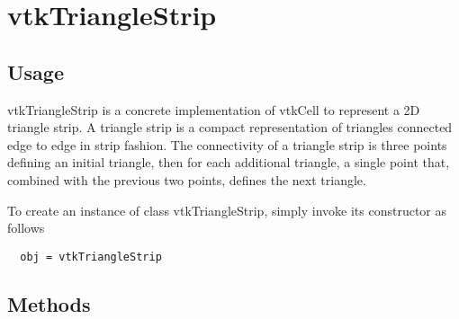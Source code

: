 \section{vtkTriangleStrip}

\subsection{Usage}

 vtkTriangleStrip is a concrete implementation of vtkCell to represent a 2D
 triangle strip. A triangle strip is a compact representation of triangles
 connected edge to edge in strip fashion. The connectivity of a triangle
 strip is three points defining an initial triangle, then for each
 additional triangle, a single point that, combined with the previous two
 points, defines the next triangle.

To create an instance of class vtkTriangleStrip, simply
invoke its constructor as follows
\begin{verbatim}
  obj = vtkTriangleStrip
\end{verbatim}
\subsection{Methods}

